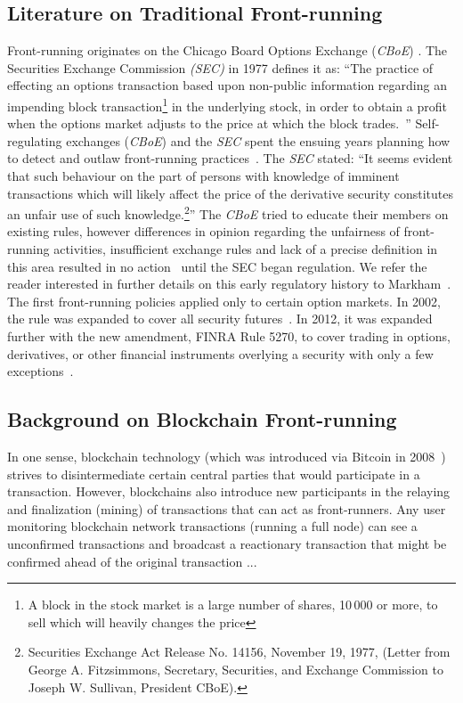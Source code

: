 \subsection{Literature on Traditional Front-running}\label{traditionalFrontrunning}
Front-running originates on the Chicago Board Options Exchange (\textit{CBoE}) \cite{markham1988front}. The Securities Exchange Commission \textit{(SEC)} in 1977 defines it as: ``The practice of effecting an options transaction based upon non-public information regarding an impending block transaction\footnote{A block in the stock market is a large number of shares, 10\,000 or more, to sell which will heavily changes the price} in the underlying stock, in order to obtain a profit when the options market adjusts to the price at which the block trades.~\cite{sec1978optionsmarket}'' Self-regulating exchanges (\eg \textit{CBoE}) and the \textit{SEC} spent the ensuing years planning how to detect and outlaw front-running practices~\cite{markham1988front}. The \textit{SEC} stated: ``It seems evident that such behaviour on the part of persons with knowledge of imminent transactions which will likely affect the price of the derivative security constitutes an unfair use of such knowledge.\footnote{Securities Exchange Act Release No. 14156, November 19, 1977, (Letter from George A. Fitzsimmons, Secretary, Securities, and Exchange Commission to Joseph W. Sullivan, President  CBoE).}'' The \textit{CBoE} tried to educate their members on existing rules, however differences in opinion regarding the unfairness of front-running activities, insufficient exchange rules and lack of a precise definition in this area resulted in no action~\cite{sec1978optionsmarket} until the SEC began regulation. We refer the reader interested in further details on this early regulatory history to Markham~\cite{markham1988front}. The first front-running policies applied only to certain option markets. In 2002, the rule was expanded to cover all security futures~\cite{finra_2002}. In 2012, it was expanded further with the new amendment, FINRA Rule 5270, to cover trading in options, derivatives, or other financial instruments overlying a security with only a few exceptions~\cite{sec2012frontrunning, finra_2012}.

\subsection{Background on Blockchain Front-running} \label{sec:Front Running on the Blockchains}

In one sense, blockchain technology (which was introduced via Bitcoin in 2008~\cite{nakamoto2008bitcoin}) strives to disintermediate certain central parties that would participate in a transaction. However, blockchains also introduce new participants in the relaying and finalization (\ie mining) of transactions that can act as front-runners. Any user monitoring blockchain network transactions (\eg running a full node) can see a unconfirmed transactions and broadcast a reactionary transaction that might be confirmed ahead of the original transaction ... 

